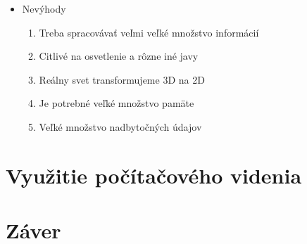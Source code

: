\documentclass[10pt,twoside,slovak,a4paper]{coursepaper}
\begin{document}
\begin{itemize}
\item Nevýhody
	\begin{enumerate}
	\item Treba spracovávať veľmi veľké množstvo informácií
	\item Citlivé na osvetlenie a rôzne iné javy
	\item Reálny svet transformujeme 3D na 2D
	\item Je potrebné veľké množstvo pamäte
	\item Veľké množstvo nadbytočných údajov 
	\end{enumerate}
\end{itemize}









\section{Využitie počítačového videnia} \label{zaver} 


\section{Záver} \label{zaver} %






\end{document}
